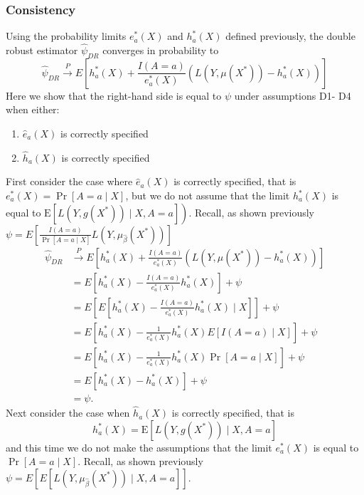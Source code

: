 
\subsubsection{Consistency}
Using the probability limits $e_a^*(X)$ and $h_a^*(X)$ defined previously, the double robust estimator $\widehat{\psi}_{DR}$ converges in probability to 
$$\widehat{\psi}_{DR} \stackrel{P}{\longrightarrow} E\left[h^*_a(X)+\frac{I(A = a)}{e^*_a(X)}\left(L\left(Y, \mu\left(X^*\right)\right)-h^*_a(X)\right)\right]$$
Here we show that the right-hand side is equal to $\psi$ under assumptions D1-
D4 when either:
\begin{enumerate}
    \item $\widehat{e}_a(X)$ is correctly specified
    \item $\widehat{h}_a(X)$ is correctly specified
\end{enumerate}
First consider the case where $\widehat{e}_a(X)$ is correctly specified, that is $e^*_a(X)=\operatorname{Pr}[A=a \mid X]$, but we do not assume that the limit $h^*_a(X)$ is equal to $\left.\mathrm{E}\left[L\left(Y, g\left(X^*\right)\right) \mid X, A=a\right]\right)$. Recall, as shown previously $\psi = E\left[\frac{I(A = a)}{\Pr[A = a \mid X]}L(Y, \mu_{\widehat{\beta}}(X^*))\right] $
$$
\begin{aligned}
\widehat{\psi}_{DR} & \stackrel{P}{\rightarrow}  E\left[h^*_a(X)+\frac{I(A = a)}{e^*_a(X)}\left(L\left(Y, \mu\left(X^*\right)\right)-h^*_a(X)\right)\right] \\
& =E\left[h^*_a(X)-\frac{I(A = a)}{e^*_a(X)}h^*_a(X)\right]+\psi \\
& =E\left[E\left[h^*_a(X)-\frac{I(A = a)}{e^*_a(X)}h^*_a(X) \mid X \right]\right]+\psi \\
& =E\left[h^*_a(X)-\frac{1}{e^*_a(X)}h^*_a(X) E\left[I(A = a) \mid X \right]\right]+\psi \\
& =E\left[h^*_a(X)-\frac{1}{e^*_a(X)}h^*_a(X) \Pr\left[A = a \mid X \right]\right]+\psi \\
& =E\left[h^*_a(X)-h^*_a(X)\right]+\psi \\
& =\psi .
\end{aligned}
$$
Next consider the case when $\widehat{h}_a(X)$ is correctly specified, that is
$$
h^*_a(X)=\mathrm{E}\left[L\left(Y, g\left(X^*\right)\right) \mid X, A=a\right]
$$
and this time we do not make the assumptions that the limit $e^*_a(X)$ is equal to $\operatorname{Pr}[A=a \mid X]$. Recall, as shown previously $\psi = E\left[E\left[L(Y, \mu_{\widehat{\beta}}(X^*))\mid X, A = a\right]\right] $. 

